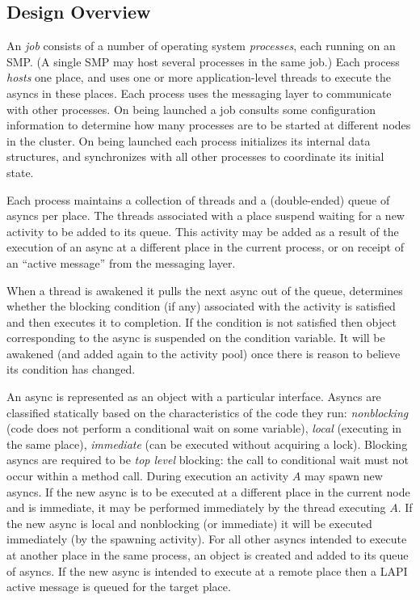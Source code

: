 \subsection{Design Overview}

An \Xten{} {\em job} consists of a number of \Xten{} operating system
{\em processes}, each running on an SMP. (A single SMP may host
several processes in the same job.) Each process {\em hosts} one
place, and uses one or more application-level threads to execute
the asyncs in these places. Each process uses the messaging layer to
communicate with other processes. On being launched a job consults
some configuration information to determine how many processes are to
be started at different nodes in the cluster.  On being launched each
process initializes its internal data structures, and synchronizes
with all other processes to coordinate its initial state.

Each process maintains a collection of threads and a (double-ended)
queue of asyncs per place. The threads associated with a place suspend
waiting for a new activity to be added to its queue. This activity may
be added as a result of the execution of an async at a different place
in the current process, or on receipt of an ``active message'' from
the messaging layer.

When a thread is awakened it pulls the next async out of the queue,
determines whether the blocking condition (if any) associated with the
activity is satisfied and then executes it to completion. If the
condition is not satisfied then object corresponding to the async is
suspended on the condition variable. It will be awakened (and added
again to the activity pool) once there is reason to believe its
condition has changed.

An async is represented as an object with a particular interface.
Asyncs are classified statically based on the characteristics of the
code they run: {\em nonblocking} (code does not perform a conditional
wait on some variable), {\em local} (executing in the same place),
{\em immediate} (can be executed without acquiring a lock). Blocking
asyncs are required to be {\em top level} blocking: the call to
conditional wait must not occur within a method call. During execution
an activity $A$ may spawn new asyncs. If the new async is to be
executed at a different place in the current node and is immediate, it
may be performed immediately by the thread executing $A$.  If the new
async is local and nonblocking (or immediate) it will be executed
immediately (by the spawning activity).  For all other asyncs intended
to execute at another place in the same process, an object is created
and added to its queue of asyncs. If the new async is intended to
execute at a remote place then a LAPI active message is queued for the
target place. 

